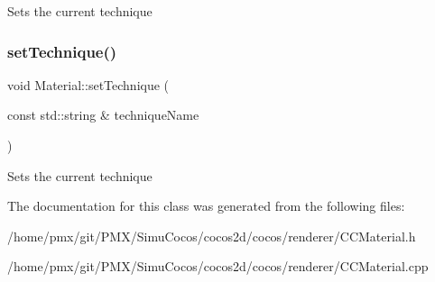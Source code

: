 Sets the current technique \mbox{\label{classMaterial_a8f575095237a64a95d08a2a3062acc4f}} 
\subsubsection{\texorpdfstring{set\+Technique()}{setTechnique()}\hspace{0.1cm}{\footnotesize\ttfamily [2/2]}}
{\footnotesize\ttfamily void Material\+::set\+Technique (\begin{DoxyParamCaption}\item[{const std\+::string \&}]{technique\+Name }\end{DoxyParamCaption})}

Sets the current technique 

The documentation for this class was generated from the following files\+:\begin{DoxyCompactItemize}
\item 
/home/pmx/git/\+P\+M\+X/\+Simu\+Cocos/cocos2d/cocos/renderer/C\+C\+Material.\+h\item 
/home/pmx/git/\+P\+M\+X/\+Simu\+Cocos/cocos2d/cocos/renderer/C\+C\+Material.\+cpp\end{DoxyCompactItemize}
